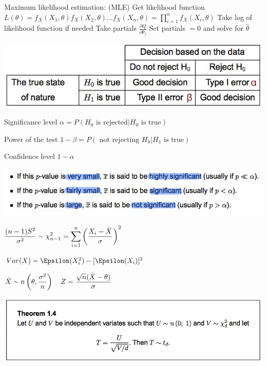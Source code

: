 \documentclass{examnotes}
\begin{document}
\vspace{6pt   }
Maximum likelihood estimation: (MLE)
 Get likelihood function ${L(\theta)=f_X(X_1,\theta)f_X(X_2,\theta)\dots f_X(X_n,\theta)=\displaystyle\prod_{i=1}^nf_X(X_i,\theta)}$
\vspace{6pt}
 Take log of likelihood function if needed 
\vspace{6pt}
 Take partials ${\displaystyle\frac{\partial Q}{\partial \theta_j}}$
\vspace{6pt}
 Set partials ${=0}$ and solve for ${\hat{\theta}}$ \quad{}

\vspace{6pt}
\includegraphics[scale=0.5]{./img/typeerrors.jpg}

Significance level $\alpha = P(H_0 \text{ is rejected}|H_0 \text{ is true})$

Power of the test $ 1-\beta = P( \text{ not rejecting } H_0 | H_1 \text{ is true})$

Confidence level $1-\alpha$

\includegraphics[scale=0.5]{./img/pvalues.jpg}

$\displaystyle\frac{(n-1)S^2}{\sigma^2} \ \mytilde\   \chi^2_{n-1} = \displaystyle\sum_{i=1}^n \left(\frac{X_i-\bar{X}}{\sigma}\right)^2$

$Var(X) = \Epsilon(X_i^2)-[\Epsilon(X_i)]^2$

\vspace{6pt}
$\bar{X} \ \mytilde\ n\left(\theta,\displaystyle\frac{\sigma^2}{n}\right) \quad Z=\displaystyle\frac{\sqrt{n}(\bar{X}-\theta)}{\sigma}$

\includegraphics[scale=0.45]{./img/thereom14.jpg}
\end{document}
